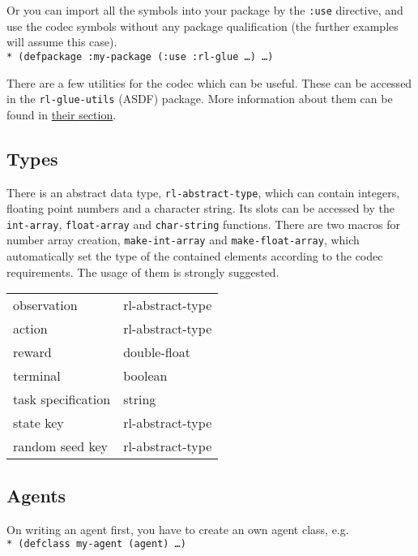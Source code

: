 \documentclass[11pt,a4paper,dvipdfm]{article}
\newcommand{\prompttext}[1]{\texttt{#1}}
\newcommand{\lispprompt}[1]{\prompttext{* #1}}
\begin{document}
Or you can import all the symbols into your package by the \prompttext{:use}
directive, and use the codec symbols without any package qualification
(the further examples will assume this case). \\
\lispprompt{(defpackage :my-package (:use :rl-glue \ldots)~\ldots)}

There are a few utilities for the codec which can be useful. These can be
accessed in the \prompttext{rl-glue-utils} (ASDF) package. More information
about them can be found in \hyperlink{rlutils}{their section}.

\subsection{Types}

There is an abstract data type, \prompttext{rl-abstract-type}, which can
contain integers, floating point numbers and a character string. Its slots can
be accessed by the \prompttext{int-array}, \prompttext{float-array} and
\prompttext{char-string} functions. There are two macros for number array
creation, \prompttext{make-int-array} and \prompttext{make-float-array},
which automatically set the type of the contained elements according to the
codec requirements. The usage of them is strongly suggested.

\begin{center}
\begin{tabular}{ll}
    observation         & rl-abstract-type \\
    action              & rl-abstract-type \\
    reward              & double-float \\
    terminal            & boolean \\
    task specification  & string \\
    state key           & rl-abstract-type \\
    random seed key     & rl-abstract-type \\
\end{tabular}
\end{center}

\subsection{Agents}

On writing an agent first, you have to create an own agent class, e.g. \\
\lispprompt{(defclass my-agent (agent) \ldots)}
\end{document}
